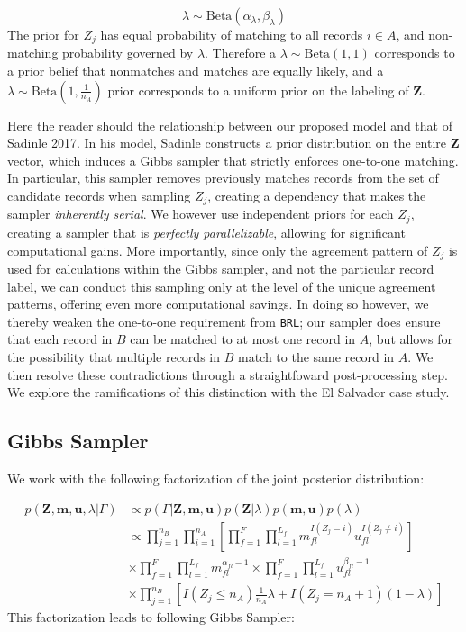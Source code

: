 \documentclass[12pt,letterpaper]{article}
\newcommand{\1}[1]{\mathbb{I}\!\left[#1\right]} %
\begin{document}
\[\lambda \sim \text{Beta}(\alpha_{\lambda}, \beta_{\lambda}) \] The
prior for \(Z_j\) has equal probability of matching to all records
\(i\in A\), and non-matching probability governed by \(\lambda\).
Therefore a \(\lambda \sim \text{Beta}(1, 1)\) corresponds to a prior
belief that nonmatches and matches are equally likely, and a
\(\lambda \sim \text{Beta}\left(1, \frac{1}{n_A}\right)\) prior
corresponds to a uniform prior on the labeling of \(\mathbf{Z}\).

Here the reader should the relationship between our proposed model and
that of Sadinle 2017. In his model, Sadinle constructs a prior
distribution on the entire \(\mathbf{Z}\) vector, which induces a Gibbs
sampler that strictly enforces one-to-one matching. In particular, this
sampler removes previously matches records from the set of candidate
records when sampling \(Z_j\), creating a dependency that makes the
sampler \emph{inherently serial}. We however use independent priors for
each \(Z_j\), creating a sampler that is \emph{perfectly parallelizable}, allowing for significant computational gains. More
importantly, since only the agreement pattern of \(Z_j\) is used for
calculations within the Gibbs sampler, and not the particular record
label, we can conduct this sampling only at the level of the unique
agreement patterns, offering even more computational savings. In doing
so however, we thereby weaken the one-to-one requirement from
\texttt{BRL}; our sampler does ensure that each record in \(B\) can be
matched to at most one record in \(A\), but allows for the possibility
that multiple records in \(B\) match to the same record in \(A\). We then resolve these contradictions through a straightfoward post-processing step. We
explore the ramifications of this distinction with the El Salvador case
study.

\hypertarget{posterior-sampling}{%
	\subsection{Gibbs Sampler}
	\label{gibbs_sampling}}
We work with the following factorization of the joint posterior distribution:

\begin{align*}
p(\mathbf{Z}, \mathbf{m}, \mathbf{u}, \lambda|\Gamma) &\propto p(\Gamma|\mathbf{Z}, \mathbf{m}, \mathbf{u}) p(\mathbf{Z} | \lambda) p(\mathbf{m}, \mathbf{u}) p(\lambda) \\
&\propto \prod_{j=1}^{n_B}  \prod_{i=1}^{n_A}\left[ \prod_{f=1}^{F}\prod_{l=1}^{L_f} m_{fl}^{I(Z_j = i)}u_{fl}^{I(Z_j \neq i)}\right] \\
&\times  \prod_{f=1}^{F}\prod_{l=1}^{L_f} m_{fl}^{\alpha_{fl} - 1}  \times\prod_{f=1}^{F}\prod_{l=1}^{L_f} u_{fl}^{\beta_{fl} - 1} \\
&\times \prod_{j=1}^{n_B} \left[I(Z_j \leq n_A)\frac{1}{n_A}\lambda + I(Z_j = n_A + 1)(1 - \lambda)\right]
\end{align*}
This factorization leads to following Gibbs Sampler:
\end{document}
